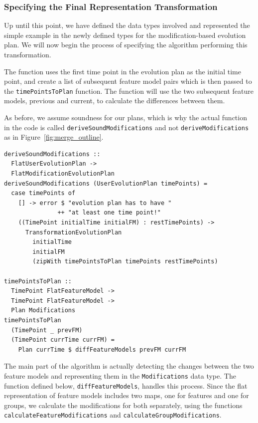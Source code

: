 \documentclass[a4paper,english]{ifimaster}
\begin{document}
\subsubsection{Specifying the Final Representation Transformation}%
\label{ssub:specifying_the_final_representation_transformation}

Up until this point, we have defined the data types involved and represented the simple example in the newly defined types for the modification-based evolution plan. We will now begin the process of specifying the algorithm performing this transformation. 

The function uses the first time point in the evolution plan as the initial time point, and create a list of subsequent feature model pairs which is then passed to the \texttt{time\-Points\-To\-Plan} function. The function will use the two subsequent feature models, previous and current, to calculate the differences between them.

As before, we assume soundness for our plans, which is why the actual function in the code is called \texttt{derive\-Sound\-Modifications} and not \texttt{derive\-Modifications} as in Figure~\ref{fig:merge_outline}.

\begin{verbatim}
deriveSoundModifications :: 
  FlatUserEvolutionPlan -> 
  FlatModificationEvolutionPlan
deriveSoundModifications (UserEvolutionPlan timePoints) = 
  case timePoints of
    [] -> error $ "evolution plan has to have " 
               ++ "at least one time point!"
    ((TimePoint initialTime initialFM) : restTimePoints) ->
      TransformationEvolutionPlan
        initialTime
        initialFM
        (zipWith timePointsToPlan timePoints restTimePoints)

timePointsToPlan ::
  TimePoint FlatFeatureModel -> 
  TimePoint FlatFeatureModel -> 
  Plan Modifications
timePointsToPlan 
  (TimePoint _ prevFM) 
  (TimePoint currTime currFM) =
    Plan currTime $ diffFeatureModels prevFM currFM
\end{verbatim}

The main part of the algorithm is actually detecting the changes between the two feature models and representing them in the \texttt{Modifications} data type. The function defined below, \texttt{diff\-Feature\-Models}, handles this process. Since the flat representation of feature models includes two maps, one for features and one for groups, we calculate the modifications for both separately, using the functions \texttt{calculate\-Feature\-Modifications} and \texttt{calculate\-Group\-Modifications}.
\end{document}
